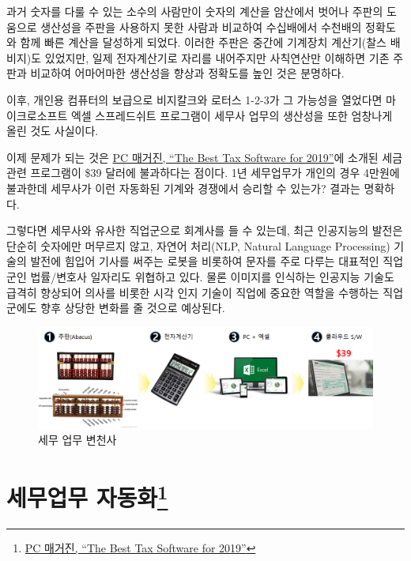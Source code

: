 \documentclass[smallextended]{svjour3}       %
\begin{document}
과거 숫자를 다룰 수 있는 소수의 사람만이 숫자의 계산을 암산에서 벗어나
주판의 도움으로 생산성을 주판을 사용하지 못한 사람과 비교하여 수십배에서
수천배의 정확도와 함께 빠른 계산을 달성하게 되었다. 이러한 주판은 중간에
기계장치 계산기(찰스 배비지)도 있었지만, 일제 전자계산기로 자리를
내어주지만 사칙연산만 이해하면 기존 주판과 비교하여 어마어마한 생산성을
향상과 정확도를 높인 것은 분명하다.

이후, 개인용 컴퓨터의 보급으로 비지칼크와 로터스 1-2-3가 그 가능성을
열었다면 마이크로소프트 엑셀 스프레드쉬트 프로그램이 세무사 업무의
생산성을 또한 엄창나게 올린 것도 사실이다.

이제 문제가 되는 것은
\href{https://www.pcmag.com/roundup/167894/the-best-tax-software}{PC
매거진, ``The Best Tax Software for 2019''}에 소개된 세금관련 프로그램이
\$39 달러에 불과하다는 점이다. 1년 세무업무가 개인의 경우 4만원에
불과한데 세무사가 이런 자동화된 기계와 경쟁에서 승리할 수 있는가? 결과는
명확하다.

그렇다면 세무사와 유사한 직업군으로 회계사를 들 수 있는데, 최근
인공지능의 발전은 단순히 숫자에만 머무르지 않고, 자연어 처리(NLP,
Natural Language Processing) 기술의 발전에 힘입어 기사를 써주는 로봇을
비롯하여 문자를 주로 다루는 대표적인 직업군인 법률/변호사 일자리도
위협하고 있다. 물론 이미지를 인식하는 인공지능 기술도 급격히 향상되어
의사를 비롯한 시각 인지 기술이 직업에 중요한 역할을 수행하는 직업군에도
향후 상당한 변화를 줄 것으로 예상된다.

\begin{figure}

{\centering \includegraphics[width=1\linewidth]{fig/tax-preparation} 

}

\caption{세무 업무 변천사}\label{fig:unnamed-chunk-1}
\end{figure}

\hypertarget{sec:1}{%
\section[세무업무 자동화]{\texorpdfstring{세무업무
자동화\footnote{\href{https://www.pcmag.com/roundup/167894/the-best-tax-software}{PC
  매거진, ``The Best Tax Software for 2019''}}}{세무업무 자동화}}\label{sec:1}}
\end{document}

